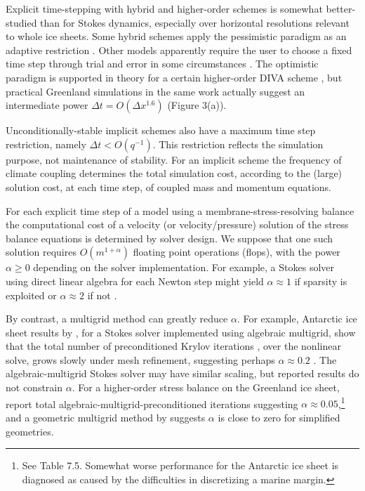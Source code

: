\documentclass[twocolumn,letterpaper]{igs}
\begin{document}
Explicit time-stepping with hybrid and higher-order schemes is somewhat better-studied than for Stokes dynamics, especially over horizontal resolutions relevant to whole ice sheets.  Some hybrid schemes apply the pessimistic paradigm as an adaptive restriction \citep{Winkelmannetal2011}.  Other models apparently require the user to choose a fixed time step through trial and error in some circumstances \citep[for example]{Fischleretal2022,Robinsonetal2022}.  The optimistic paradigm is supported in theory for a certain higher-order DIVA scheme \citep[see equation (52)]{Robinsonetal2022}, but practical Greenland simulations in the same work actually suggest an intermediate power $\Delta t = O(\Delta x^{1.6})$ (Figure 3(a)).

Unconditionally-stable implicit schemes also have a maximum time step restriction, namely $\Delta t < O(q^{-1})$.  This restriction reflects the simulation purpose, not maintenance of stability.  For an implicit scheme the frequency of climate coupling determines the total simulation cost, according to the (large) solution cost, at each time step, of coupled mass and momentum equations.

For each explicit time step of a model using a membrane-stress-resolving balance the computational cost of a velocity (or velocity/pressure) solution of the stress balance equations is determined by solver design.  We suppose that one such solution requires $O(m^{1+\alpha})$ floating point operations (flops),  with the power $\alpha\ge 0$ depending on the solver implementation.  For example, a Stokes solver using direct linear algebra for each Newton step might yield $\alpha \approx 1$ if sparsity is exploited or $\alpha \approx 2$ if not \citep{Bueler2021}.


By contrast, a multigrid method \citep{Trottenbergetal2001} can greatly reduce $\alpha$.  For example, Antarctic ice sheet results by \cite{IsaacStadlerGhattas2015}, for a Stokes solver implemented using algebraic multigrid, show that the total number of preconditioned Krylov iterations \citep{Bueler2021}, over the nonlinear solve, grows slowly under mesh refinement, suggesting perhaps $\alpha\approx 0.2$ \citep[Table 8.1]{IsaacStadlerGhattas2015}.  The \cite{Lengetal2012} algebraic-multigrid Stokes solver may have similar scaling, but reported results do not constrain $\alpha$.  For a higher-order stress balance on the Greenland ice sheet, \cite{Tuminaroetal2016} report total algebraic-multigrid-preconditioned iterations suggesting $\alpha \approx 0.05$,\footnote{See Table 7.5.  Somewhat worse performance for the Antarctic ice sheet is diagnosed as caused by the difficulties in discretizing a marine margin.} and a geometric multigrid method by \citep{BrownSmithAhmadia2013} suggests $\alpha$ is close to zero for simplified geometries.
\end{document}
